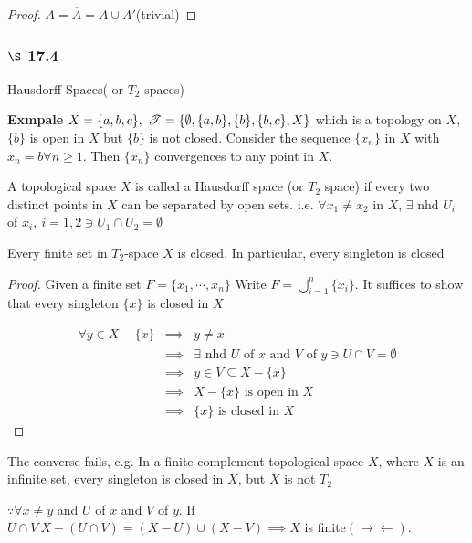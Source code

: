 \begin{proof}
	$A = \overline{A} = A \cup A'$(trivial)
\end{proof}

\subsubsection*{$\S$ 17.4} Hausdorff Spaces( or $T_2$-spaces)

\textbf{Exmpale} $X = \{a,b,c\},~\mathscr{T} = \{\emptyset,\{a,b\},\{b\},\{b,c\},X\}$ which is a topology on $X$, $\{b\}$ is open in $X$ but $\{b\}$ is not closed. Consider the sequence $\{x_n\}$ in $X$ with $x_n = b \forall n \geq 1$. Then $\{x_n\}$ convergences to any point in $X$.

\begin{defn}
	A topological space $X$ is called a Hausdorff space (or $T_2$ space) if every two distinct points in $X$ can be separated by open sets. i.e. $\forall x_1 \neq x_2$ in $X$, $\exists$ nhd $U_i$ of $x_i,~i = 1,2 \ni U_1 \cap U_2 = \emptyset$
\end{defn}

\begin{thm*}
	Every finite set in $T_2$-space $X$ is closed. In particular, every singleton is closed
\end{thm*}

\begin{proof}
	Given a finite set $F = \{x_1 ,\cdots,x_n\}$ Write $F = \bigcup_{i = 1}^n\{x_i\}$. It suffices to show that every singleton $\{x\}$ is closed in $X$
	
	\begin{eqnarray*}
		\forall y \in X-\{x\} &\implies& y \neq x\\
		&\implies & \exists \text{ nhd } U \text{ of } x \text{ and } V \text{ of } y \ni U \cap V = \emptyset\\
		&\implies & y \in V \subseteq X - \{x\}\\
		& \implies &X - \{x\} \text{ is open in } X\\
		& \implies &\{ x\} \text{ is closed in }X
	\end{eqnarray*}
\end{proof}

\begin{rmk*}
	The converse fails, e.g. In a finite complement topological space $X$, where $X$ is an infinite set, every singleton is closed in $X$, but $X$ is not $T_2$
	
	$\because \forall x \neq y$ and $U$ of $x$ and $V$ of $y$. If $U \cap V~X-(U \cap V) = (X - U) \cup (X - V) \implies X$ is finite$(\rightarrow\leftarrow)$.
\end{rmk*}
















